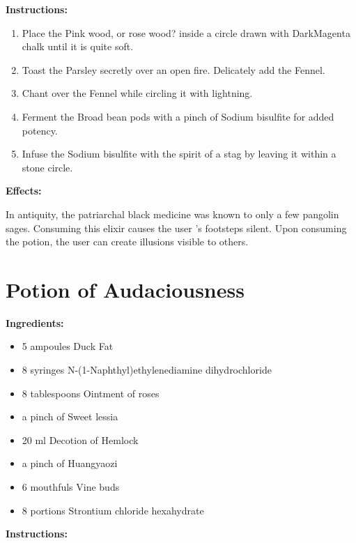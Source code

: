 \documentclass{article}
\begin{document}
\textbf{Instructions:}

\begin{enumerate}
  \item Place the Pink wood, or rose wood? inside a circle drawn with DarkMagenta chalk until it is quite soft.
  \item Toast the Parsley secretly over an open fire. Delicately add the Fennel.
  \item Chant over the Fennel while circling it with lightning.
  \item Ferment the Broad bean pods with a pinch of Sodium bisulfite for added potency.
  \item Infuse the Sodium bisulfite with the spirit of a stag by leaving it within a stone circle.
\end{enumerate}

\textbf{Effects:}

In antiquity, the patriarchal black medicine was known to only a few pangolin sages. Consuming this elixir causes the user 's footsteps silent. Upon consuming the potion, the user can create illusions visible to others.

\newpage
\section*{Potion of Audaciousness}

\textbf{Ingredients:}

\begin{itemize}
  \item 5 ampoules Duck Fat
  \item 8 syringes N-(1-Naphthyl)ethylenediamine dihydrochloride
  \item 8 tablespoons Ointment of roses
  \item a pinch of Sweet lessia
  \item 20 ml Decotion of Hemlock
  \item a pinch of Huangyaozi
  \item 6 mouthfuls Vine buds
  \item 8 portions Strontium chloride hexahydrate
\end{itemize}

\textbf{Instructions:}
\end{document}
